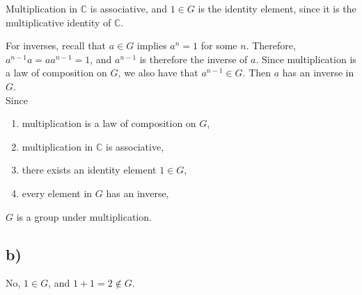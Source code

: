 \documentclass[a4paper,12pt]{article}
\begin{document}
Multiplication in $\mathbb{C}$ is associative, and $1 \in G$ is the identity element, since it is the multiplicative identity of $\mathbb{C}$.

For inverses, recall that $a \in G$ implies $a^n = 1$ for some $n$. Therefore, $a^{n-1}a = a a^{n-1} = 1$, and $a^{n-1}$ is therefore the inverse of $a$. Since multiplication is a law of composition on $G$, we also have that $a^{n-1} \in G$. Then $a$ has an inverse in $G$. \\

Since

\begin{enumerate}
    \item multiplication is a law of composition on $G$,
    \item multiplication in $\mathbb{C}$ is associative,
    \item there exists an identity element $1 \in G$,
    \item every element in $G$ has an inverse,
\end{enumerate}
$G$ is a group under multiplication.


\subsection*{b)}

No, $1 \in G$, and $1 + 1 = 2 \notin G$.
\end{document}
